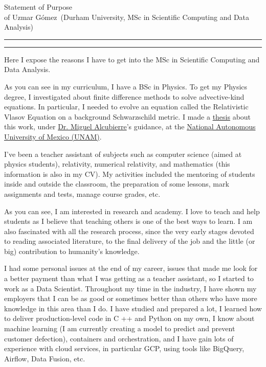 \documentclass{article}
\newcommand{\soptitle}{Statement of Purpose}
\newcommand{\yourname}{Uzmar G\'omez}
\begin{document}
\begin{center}\LARGE\soptitle\\
\large of \yourname\ (Durham University, MSc in Scientific Computing and Data Analysis)
\end{center}

\hrule
\vspace{1pt}
\hrule height 1pt

\bigskip

Here I expose the reasons I have to get into the MSc in Scientific Computing and Data Analysis.

As you can see in my curriculum,  I have a BSc in Physics. To get my Physics degree, I investigated about finite difference methods to solve advective-kind equations. In particular, I needed to evolve an equation called the Relativistic Vlasov Equation on a background Schwarzschild metric. I made a \href{http://oreon.dgbiblio.unam.mx/F/YF3LAD8UIUFR2XRPDE3H6JM2MI44M8RY8QX1RH7K429163KKEV-19694?func=find-b&request=uzmar&find_code=WRD&adjacent=N&local_base=TES01&x=65&y=13&filter_code_2=WYR&filter_request_2=&filter_code_3=WYR&filter_request_3=}{thesis} about this work, under \href{https://sigi.nucleares.unam.mx/sgiicn/people/user/view/id/8}{Dr. Miguel Alcubierre}'s guidance, at the \href{https://www.unam.mx/}{National Autonomous University of Mexico (UNAM)}. 

I've been a teacher assistant of subjects such as computer science (aimed at physics students), relativity, numerical relativity, and mathematics (this information is also in my CV). My activities included the mentoring of students inside and outside the classroom, the preparation of some lessons, mark assignments and tests, manage course grades, etc. 

As you can see, I am interested in research and academy. I love to teach and help students as I believe that teaching others is one of the best ways to learn. I am also fascinated with all the research process, since the very early stages devoted to reading associated literature, to the final delivery of the job and the little (or big) contribution to humanity's knowledge. 

I had some personal issues at the end of my career, issues that made me look for a better payment than what I was getting as a teacher assistant, so I started to work as a Data Scientist. Throughout my time in the industry, I have shown my employers that I can be as good or sometimes better than others who have more knowledge in this area than I do. I have studied and prepared a lot, I learned how to deliver production-level code in C ++ and Python on my own, I know about machine learning (I am currently creating a model to predict and prevent customer defection), containers and orchestration, and I have gain lots of experience with cloud services, in particular GCP, using tools like BigQuery, Airflow, Data Fusion, etc.
\end{document}
